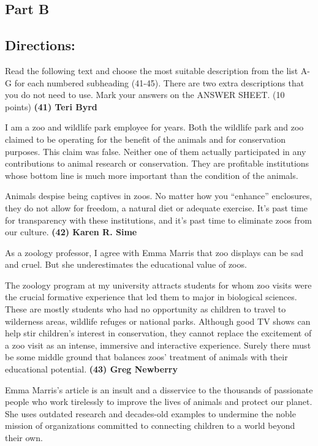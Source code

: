 \documentclass[UTF8,11pt]{ctexart}
\begin{document}
\subsection*{\textbf{Part B}}


\subsection*{\textbf{Directions:}}


Read the following text and choose the most suitable description from the list A-G for each numbered subheading (41-45). There are two extra descriptions that you do not need to use. Mark your answers on the ANSWER SHEET. (10 points) \textbf{(41) Teri Byrd}


I am a zoo and wildlife park employee for years. Both the wildlife park and zoo claimed to be operating for the benefit of the animals and for conservation purposes. This claim was false. Neither one of them actually participated in any contributions to animal research or conservation. They are profitable institutions whose bottom line is much more important than the condition of the animals.


Animals despise being captives in zoos. No matter how you “enhance” enclosures, they do not allow for freedom, a natural diet or adequate exercise. It’s past time for transparency with these institutions, and it’s past time to eliminate zoos from our culture. \textbf{(42) Karen R. Sime}


As a zoology professor, I agree with Emma Marris that zoo displays can be sad and cruel. But she underestimates the educational value of zoos.


The zoology program at my university attracts students for whom zoo visits were the crucial formative experience that led them to major in biological sciences. These are mostly students who had no opportunity as children to travel to wilderness areas, wildlife refuges or national parks. Although good TV shows can help stir children’s interest in conservation, they cannot replace the excitement of a zoo visit as an intense, immersive and interactive experience. Surely there must be some middle ground that balances zoos’ treatment of animals with their educational potential. \textbf{(43) Greg Newberry}


Emma Marris’s article is an insult and a disservice to the thousands of passionate people who work tirelessly to improve the lives of animals and protect our planet. She uses outdated research and decades-old examples to undermine the noble mission of organizations committed to connecting children to a world beyond their own.
\end{document}
